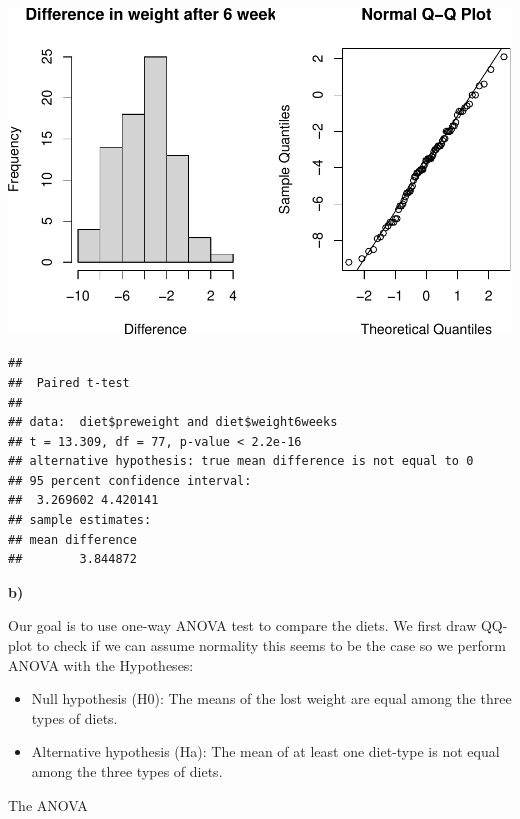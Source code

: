 \documentclass[
]{article}
\newenvironment{Shaded}{\begin{snugshade}}{\end{snugshade}}
\newcommand{\AttributeTok}[1]{\textcolor[rgb]{0.77,0.63,0.00}{#1}}
\newcommand{\ConstantTok}[1]{\textcolor[rgb]{0.00,0.00,0.00}{#1}}
\newcommand{\FunctionTok}[1]{\textcolor[rgb]{0.00,0.00,0.00}{#1}}
\newcommand{\NormalTok}[1]{#1}
\newcommand{\SpecialCharTok}[1]{\textcolor[rgb]{0.00,0.00,0.00}{#1}}
\begin{document}
\includegraphics{assignment_1_files/figure-latex/unnamed-chunk-21-2.pdf}

\begin{Shaded}
\end{Shaded}

\begin{verbatim}
## 
##  Paired t-test
## 
## data:  diet$preweight and diet$weight6weeks
## t = 13.309, df = 77, p-value < 2.2e-16
## alternative hypothesis: true mean difference is not equal to 0
## 95 percent confidence interval:
##  3.269602 4.420141
## sample estimates:
## mean difference 
##        3.844872
\end{verbatim}

\textbf{b)}

Our goal is to use one-way ANOVA test to compare the diets. We first
draw QQ-plot to check if we can assume normality this seems to be the
case so we perform ANOVA with the Hypotheses:

\begin{itemize}
\item
  Null hypothesis (H0): The means of the lost weight are equal among the
  three types of diets.
\item
  Alternative hypothesis (Ha): The mean of at least one diet-type is not
  equal among the three types of diets.
\end{itemize}

The ANOVA
\end{document}
